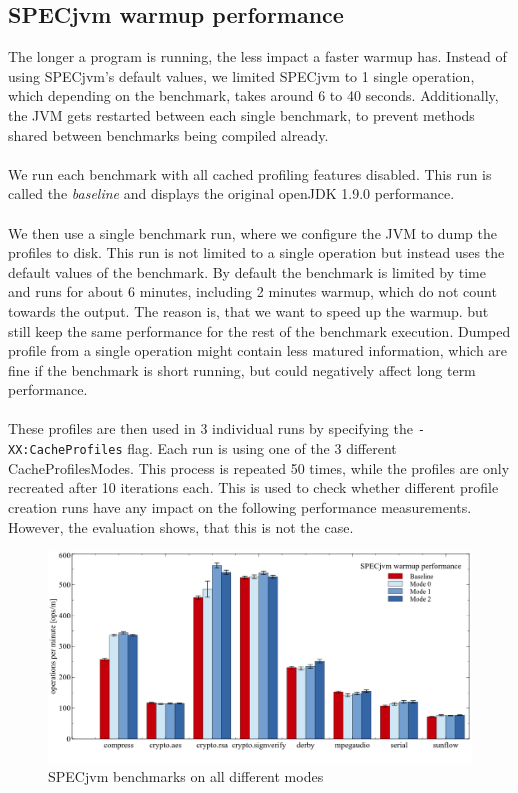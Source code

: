 \subsection{SPECjvm warmup performance}
\label{s:perf_specjvm_warmup}
The longer a program is running, the less impact a faster warmup has. 
Instead of using SPECjvm's default values, we limited SPECjvm to 1 single operation, which depending on the benchmark, takes around 6 to 40 seconds.
Additionally, the JVM gets restarted between each single benchmark, to prevent methods shared between benchmarks being compiled already.
\\\\
We run each benchmark with all cached profiling features disabled. This run is called the \textit{baseline} and displays the original openJDK 1.9.0 performance.    
\\\\ 
We then use a single benchmark run, where we configure the JVM to dump the profiles to disk. This run is not limited to a single operation but instead uses the default values of the benchmark. By default the benchmark is limited by time and runs for about 6 minutes, including 2 minutes warmup, which do not count towards the output. The reason is, that we want to speed up the warmup. but still keep the same performance for the rest of the benchmark execution. Dumped profile from a single operation might contain less matured information, which are fine if the benchmark is short running, but could negatively affect long term performance.
\\\\
These profiles are then used in 3 individual runs by specifying the \texttt{-XX:CacheProfiles} flag. Each run is using one of the 3 different CacheProfilesModes. This process is repeated 50 times, while the profiles are only recreated after 10 iterations each. This is used to check whether different profile creation runs have any impact on the following performance measurements. However, the evaluation shows, that this is not the case.
\begin{figure}[ht]
  \begin{center}
    \centering
    \includegraphics[width=1.0\textwidth]{figures/others_warmup.png}
    \caption{SPECjvm benchmarks on all different modes}
    \label{f:others_warmup}
  \end{center}
\end{figure}
